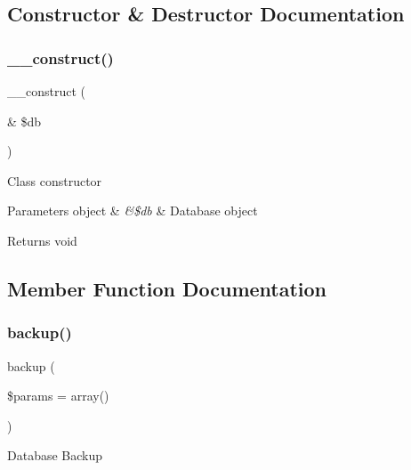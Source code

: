 \subsection{Constructor \& Destructor Documentation}
\mbox{\label{class_c_i___d_b__utility_aaf2ef772755ec6f361d44e16cc9ffd69}} 
\subsubsection{\texorpdfstring{\+\_\+\+\_\+construct()}{\_\_construct()}}
{\footnotesize\ttfamily \+\_\+\+\_\+construct (\begin{DoxyParamCaption}\item[{\&}]{\$db }\end{DoxyParamCaption})}

Class constructor


\begin{DoxyParams}[1]{Parameters}
object & {\em \&\$db} & Database object \\
\hline
\end{DoxyParams}
\begin{DoxyReturn}{Returns}
void 
\end{DoxyReturn}


\subsection{Member Function Documentation}
\mbox{\label{class_c_i___d_b__utility_abe2b9d47f950dfbaf8c6ec757a9af9a2}} 
\subsubsection{\texorpdfstring{backup()}{backup()}}
{\footnotesize\ttfamily backup (\begin{DoxyParamCaption}\item[{}]{\$params = {\ttfamily array()} }\end{DoxyParamCaption})}

Database Backup


